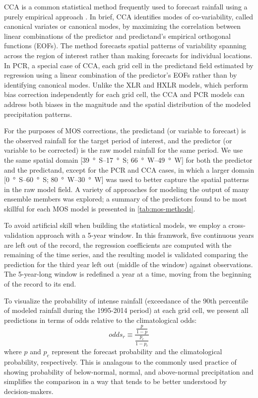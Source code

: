\documentclass[twocol]{ametsoc}
\begin{document}
CCA is a common statistical method frequently used to forecast rainfall using a purely empirical approach \citep{Mason:2008da,Barnston:2012ce}.
In brief, CCA \citep{Barnston:1992gd,Wilks:2006fx} identifies modes of co-variability, called canonical variates or canonical modes, by maximizing the correlation between linear combinations of the predictor and predictand's empirical orthogonal functions (EOFs).
The method forecasts spatial patterns of variability spanning across the region of interest rather than making forecasts for individual locations.
In PCR, a special case of CCA, each grid cell in the predictand field estimated by regression using a linear combination of the predictor's EOFs \citep{Mason:2008da,Wilks:2006fx} rather than by identifying canonical modes.
Unlike the XLR and HXLR models, which perform bias correction independently for each grid cell, the CCA and PCR models can address both biases in the magnitude and the spatial distribution of the modeled precipitation patterns.

For the purposes of MOS corrections, the predictand (or variable to forecast) is the observed rainfall for the target period of interest, and the predictor (or variable to be corrected) is the raw model rainfall for the same period.
We use the same spatial domain [\SIrange{39}{17}{\degree S}; \SIrange{66}{49}{\degree W}] for both the predictor and the predictand, except for the PCR and CCA cases, in which a larger domain [\SIrange{0}{60}{\degree S}; \SIrange{80}{30}{\degree W}] was used to better capture the spatial patterns in the raw model field.
A variety of approaches for modeling the output of many ensemble members was explored; a summary of the predictors found to be most skillful for each MOS model is presented in \cref{tab:mos-methods}.

To avoid artificial skill when building the statistical models, we employ a cross-validation approach with a 5-year window.
In this framwork, five continuous years are left out of the record, the regression coefficients are computed with the remaining of the time series, and the resulting model is validated comparing the prediction for the third year left out (middle of the window) against observations.
The 5-year-long window is redefined a year at a time, moving from the beginning of the record to its end.

To visualize the probability of intense rainfall (exceedance of the 90th percentile of modeled rainfall during the 1995-2014 period) at each grid cell, we present all predictions in terms of odds relative to the climatological odds:
\begin{equation} \label{eq:odds-ratio}
odds_{r} \equiv \frac{\frac{p}{1-p}}{\frac{p_c}{1-p_c}}
\end{equation}
where $p$ and $p_c$ represent the forecast probability and the climatological probability, respectively.
This is analagous to the commonly used practice of showing probability of below-normal, normal, and above-normal precipitation and simplifies the comparison in a way that tends to be better understood by decision-makers.
\end{document}
